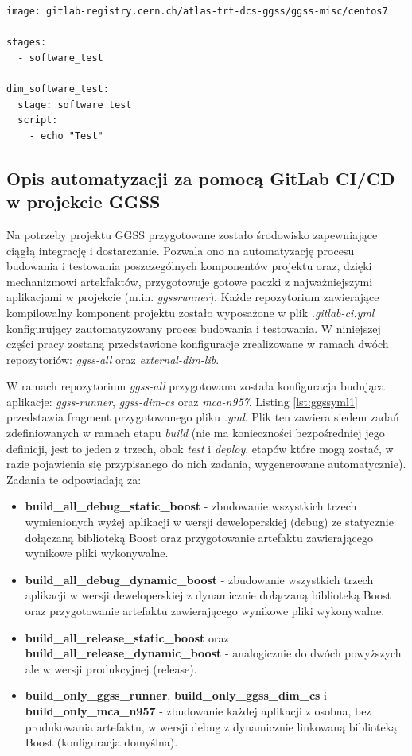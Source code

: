 \begin{lstlisting}[caption={Przykład prostego pliku \textit{.gitlab-ci.yml} generującego jeden etap procesu CI/CD oraz jedno zadanie w ramach tego etapu}, label={lst:yml1}]
image: gitlab-registry.cern.ch/atlas-trt-dcs-ggss/ggss-misc/centos7

stages:
  - software_test

dim_software_test:
  stage: software_test
  script:
    - echo "Test"

\end{lstlisting}

\subsection{Opis automatyzacji za pomocą GitLab CI/CD w projekcie GGSS}
Na potrzeby projektu GGSS przygotowane zostało środowisko zapewniające ciągłą integrację i dostarczanie. Pozwala ono na automatyzację procesu budowania i testowania poszczególnych komponentów projektu oraz, dzięki mechanizmowi artekfaktów, przygotowuje gotowe paczki z najważniejszymi aplikacjami w projekcie (m.in. \textit{ggssrunner}). Każde repozytorium zawierające kompilowalny komponent projektu zostało wyposażone w plik \textit{.gitlab-ci.yml} konfigurujący zautomatyzowany proces budowania i testowania. W niniejszej części pracy zostaną przedstawione konfiguracje zrealizowane w ramach dwóch repozytoriów: \textit{ggss-all} oraz \textit{external-dim-lib}. 

W ramach repozytorium \textit{ggss-all} przygotowana została konfiguracja budująca aplikacje: \textit{ggss-runner}, \textit{ggss-dim-cs} oraz \textit{mca-n957}. Listing \ref{lst:ggssyml1} przedstawia fragment przygotowanego pliku \textit{.yml}. Plik ten zawiera siedem zadań zdefiniowanych w ramach etapu \textit{build} (nie ma konieczności bezpośredniej jego definicji, jest to jeden z trzech, obok \textit{test} i \textit{deploy}, etapów które mogą zostać, w razie pojawienia się przypisanego do nich zadania, wygenerowane automatycznie). Zadania te odpowiadają za:
\begin{itemize}
\item \textbf{build\_all\_debug\_static\_boost} - zbudowanie wszystkich trzech wymienionych wyżej aplikacji w wersji deweloperskiej (debug) ze statycznie dołączaną biblioteką Boost oraz przygotowanie artefaktu zawierającego wynikowe pliki wykonywalne.
\item \textbf{build\_all\_debug\_dynamic\_boost} - zbudowanie wszystkich trzech aplikacji w wersji deweloperskiej z dynamicznie dołączaną biblioteką Boost oraz przygotowanie artefaktu zawierającego wynikowe pliki wykonywalne.
\item \textbf{build\_all\_release\_static\_boost} oraz \textbf{build\_all\_release\_dynamic\_boost} - analogicznie do dwóch powyższych ale w wersji produkcyjnej (release).
\item \textbf{build\_only\_ggss\_runner}, \textbf{build\_only\_ggss\_dim\_cs} i \textbf{build\_only\_mca\_n957} - zbudowanie każdej aplikacji z osobna, bez produkowania artefaktu, w wersji debug z dynamicznie linkowaną biblioteką Boost (konfiguracja domyślna).
\end{itemize}

